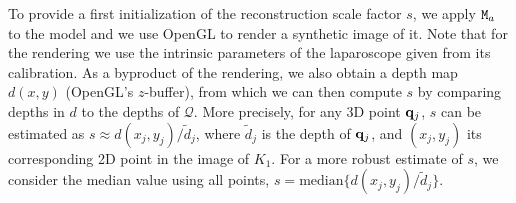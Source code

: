 
To provide a first initialization of the reconstruction scale factor $s$, we apply $\mat{M}_a$ to the model and we use OpenGL to render a synthetic image of it.
Note that for the rendering we use the intrinsic parameters of the laparoscope given from its calibration.
As a byproduct of the rendering, we also obtain a depth map $d(x,y)$ (OpenGL's $z$-buffer), from which we can then compute $s$ by comparing depths in $d$ to the depths of $\mathcal{Q}$.
More precisely, for any 3D point $\mathbf{q}_j$, $s$ can be estimated as $s\approx d(x_j,y_j)/\tilde{d}_j$, where $\tilde{d}_j$ is the depth of $\mathbf{q}_j$, and $(x_j,y_j)$ its corresponding 2D point in the image of $K_1$.
For a more robust estimate of $s$, we consider the median value using all points, \ie $s=\mathrm{median} \{d(x_j,y_j)/\tilde{d}_j\}$. 


